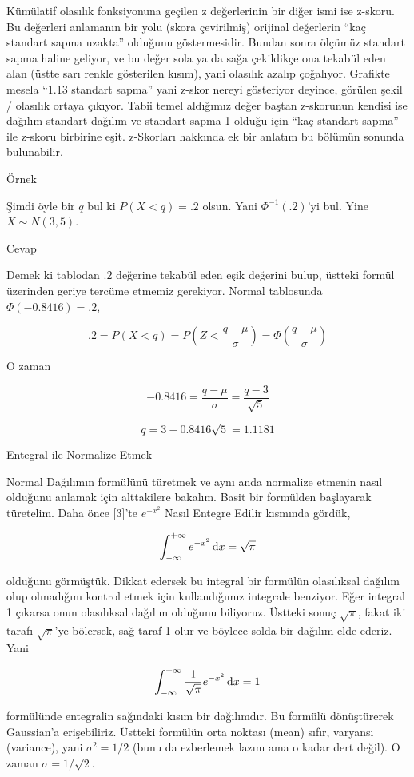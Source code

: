 \documentclass[12pt,fleqn]{article}\usepackage{../../common}
\begin{document}
Kümülatif olasılık fonksiyonuna geçilen z değerlerinin bir diğer ismi ise
z-skoru. Bu değerleri anlamanın bir yolu (skora çevirilmiş) orijinal
değerlerin ``kaç standart sapma uzakta'' olduğunu göstermesidir. Bundan
sonra ölçümüz standart sapma haline geliyor, ve bu değer sola ya da sağa
çekildikçe ona tekabül eden alan (üstte sarı renkle gösterilen kısım), yani
olasılık azalıp çoğalıyor. Grafikte mesela ``1.13 standart sapma'' yani
z-skor nereyi gösteriyor deyince, görülen şekil / olasılık ortaya
çıkıyor. Tabii temel aldığımız değer baştan z-skorunun kendisi ise dağılım
standart dağılım ve standart sapma 1 olduğu için ``kaç standart sapma'' ile
z-skoru birbirine eşit. z-Skorları hakkında ek bir anlatım bu bölümün
sonunda bulunabilir.

Örnek 

Şimdi öyle bir $q$ bul ki $P(X < q) = .2$ olsun. Yani $\Phi^{-1}(.2)$'yi
bul. Yine $X \sim N(3,5)$. 

Cevap 

Demek ki tablodan $.2$ değerine tekabül eden eşik değerini bulup, üstteki
formül üzerinden geriye tercüme etmemiz gerekiyor. Normal tablosunda
$\Phi(-0.8416) = .2$, 

$$ .2 = P(X<q) = P( Z < \frac{ q - \mu}{\sigma}) = \Phi(\frac{ q - \mu}{\sigma})
$$

O zaman 

$$ -0.8416 = \frac{q - \mu}{\sigma} = \frac{ q - 3}{\sqrt{ 5}} $$

$$ q = 3 - 0.8416 \sqrt{ 5} = 1.1181 $$

Entegral ile Normalize Etmek

Normal Dağılımın formülünü türetmek ve aynı anda normalize etmenin nasıl
olduğunu anlamak için alttakilere bakalım. Basit bir formülden başlayarak
türetelim. Daha önce [3]'te $e^{-x^2}$ Nasıl Entegre Edilir kısmında gördük,

$$ \int _{-\infty}^{+\infty} e^{-x^2} \,\mathrm{d} x= \sqrt{\pi} $$

olduğunu görmüştük. Dikkat edersek bu integral bir formülün olasılıksal dağılım
olup olmadığını kontrol etmek için kullandığımız integrale benziyor. Eğer
integral 1 çıkarsa onun olasılıksal dağılım olduğunu biliyoruz. Üstteki sonuç
$\sqrt{\pi}$, fakat iki tarafı $\sqrt{\pi}$'ye bölersek, sağ taraf 1 olur ve
böylece solda bir dağılım elde ederiz. Yani

$$ \int _{-\infty}^{+\infty} \frac{1}{\sqrt{\pi}} e^{-x^2} \,\mathrm{d} x = 1$$

formülünde entegralin sağındaki kısım bir dağılımdır. Bu formülü dönüştürerek
Gaussian'a erişebiliriz. Üstteki formülün orta noktası (mean) sıfır, varyansı
(variance), yani $\sigma^2 = 1/2$ (bunu da ezberlemek lazım ama o kadar dert
değil). O zaman $\sigma = 1 / \sqrt{2}$.
\end{document}
